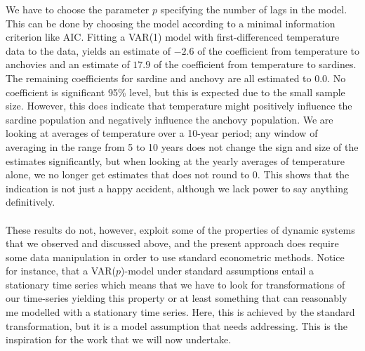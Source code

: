 \documentclass[11pt, a4paper]{memoir}
\theoremstyle{break}
\theoremstyle{break}
\theoremstyle{nonumberplain}
\begin{document}
We have to choose the parameter $p$ specifying the number of lags in the model. This can be done by choosing the model according to a minimal information criterion like AIC. Fitting a VAR(1) model with first-differenced temperature data to the data, yields an estimate of $-2.6$ of the coefficient from temperature to anchovies and an estimate of $17.9$ of the coefficient from temperature to sardines. The remaining coefficients for sardine and anchovy are all estimated to $0.0$. No coefficient is significant 95\% level, but this is expected due to the small sample size. However, this does indicate that temperature might positively influence the sardine population and negatively influence the anchovy population. We are looking at averages of temperature over a 10-year period; any window of averaging in the range from 5 to 10 years does not change the sign and size of the estimates significantly, but when looking at the yearly averages of temperature alone, we no longer get estimates that does not round to 0. This shows that the indication is not just a happy accident, although we lack power to say anything definitively.\\\\ 
These results do not, however, exploit some of the properties of dynamic systems that we observed and discussed above, and the present approach does require some data manipulation in order to use standard econometric methods. Notice for instance, that a VAR($p$)-model under standard assumptions entail a stationary time series which means that we have to look for transformations of our time-series yielding this property or at least something that can reasonably me modelled with a stationary time series. Here, this is achieved by the standard transformation, but it is a model assumption that needs addressing. This is the inspiration for the work that we will now undertake.
\end{document}
